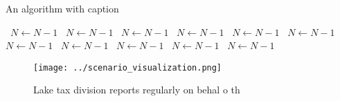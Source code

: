 \documentclass[a4paper]{article}
\begin{document}
\begin{algorithm}
\caption{An algorithm with caption}
\begin{algorithmic}
\    \State $N \gets N - 1$
\    \State $N \gets N - 1$
\    \State $N \gets N - 1$
\    \State $N \gets N - 1$
\    \State $N \gets N - 1$
\    \State $N \gets N - 1$
\    \State $N \gets N - 1$
\    \State $N \gets N - 1$
\    \State $N \gets N - 1$
\    \State $N \gets N - 1$
\    \State $N \gets N - 1$
\EndWhile
\end{algorithmic}
\end{algorithm}

\begin{figure}
\centering
\texttt{[image: ../scenario\_visualization.png]}
\caption{Lake tax division reports regularly on behal o th
}
\end{figure}
 
\end{document}
